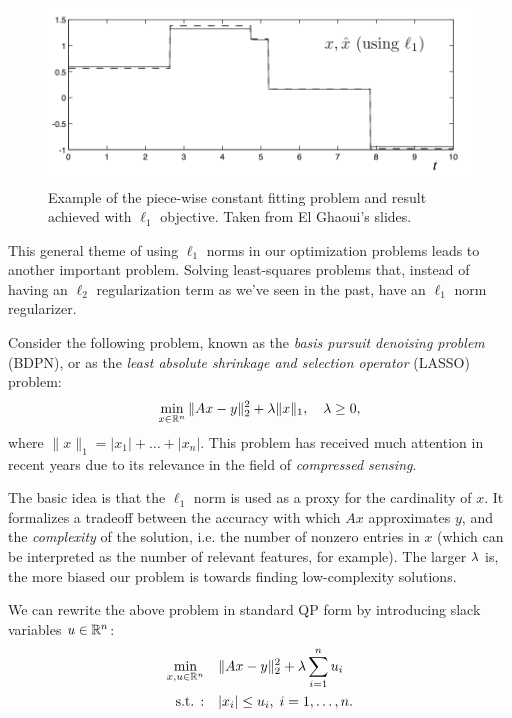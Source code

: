 \documentclass[11 pt]{scrartcl}
\begin{document}
\begin{figure}[!htb]
    \centering
    \includegraphics[scale=0.5]{pw_constant.png}
    \caption{Example of the piece-wise constant fitting problem and result achieved with $\ell_1$ objective. Taken from El Ghaoui's slides.}
\end{figure}

This general theme of using $\ell_1$ norms in our optimization problems leads to another important problem. 
Solving least-squares problems that, instead of having an $\ell_2$ regularization term as we've seen in the past, have an $\ell_1$ norm regularizer. 
\begin{example}[LASSO]
    Consider the following problem, known as the \emph{basis pursuit denoising problem} (BDPN), or as the \emph{least absolute shrinkage and selection operator} (LASSO) problem:
    \[ \min_{x\in \mathbb R^n} \|Ax-y\|^2_2 + \lambda\|x\|_1, \quad \lambda \geq 0,\] 
    where $\|x\|_1 = |x_1|+\dots + |x_n|$.
    This problem has received much attention in recent years due to its relevance in the field of \emph{compressed sensing}. 

    The basic idea is that the $\ell_1$ norm is used as a proxy for the cardinality of $x$. 
    It formalizes a tradeoff between the accuracy with which $Ax$ approximates $y$, and the \emph{complexity} of the solution, i.e. the number of nonzero entries in $x$ (which can be interpreted as the number of relevant features, for example). 
    The larger $\lambda$ is, the more biased our problem is towards finding low-complexity solutions. 

    We can rewrite the above problem in standard QP form by introducing slack variables $u\in \mathbb R^n$: 
    \begin{align*}
        \min_{x,u\in\mathbb R^n}\quad &\|Ax-y\|_2^2 + \lambda \sum_{i=1}^n u_i \\ 
        \text{s.t. : }\;\; &|x_i|\leq u_i,\; i=1,\dots, n.
    \end{align*}
\end{example}
\end{document}
